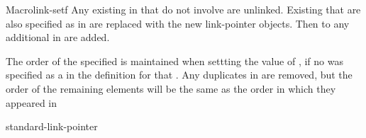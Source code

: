 \documentclass[10pt,twoside,english,pdftex]{article}
\begin{document}
\begin{functiondoc}{Macro}{link-setf}
\fndescription 
%
Any existing  in  that 
do not involve  are unlinked.  
Existing  that are also specified as  in
 are replaced with the new
link-pointer objects. Then  to any additional
 in 
are added.

The order of the specified  is
maintained when settting the value of , if
no  was specified as a
 in the  definition for that
.  Any duplicates in
 are removed, but the order of the
remaining elements will be the same as the order in which they appeared in

\begin{alsos}{standard-link-pointer}
\also[linkf]
\also[unlinkf]
\end{alsos}


\end{functiondoc}
\end{document}
